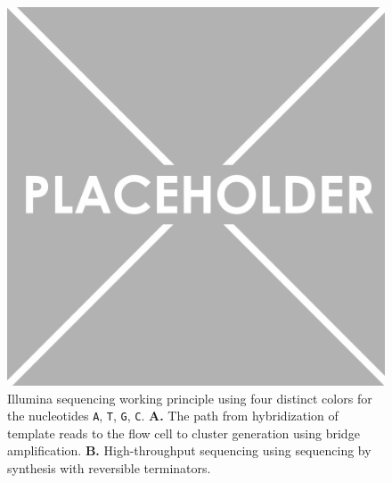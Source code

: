 \documentclass[11pt]{book}
\begin{document}
\begin{figure}[t!]
\centering
\includegraphics[width=\textwidth,trim=0 5cm 0 0,clip]{img/placeholder.png}
\caption[Illumina Sequencing Working Principle]{Illumina sequencing working principle using four distinct colors for the nucleotides \texttt{A}, \texttt{T}, \texttt{G}, \texttt{C}. \textbf{A.} The path from hybridization of template reads to the flow cell to cluster generation using bridge amplification. \textbf{B.} High-throughput sequencing using sequencing by synthesis with reversible terminators.}
\label{fig:illumina-seq}
\end{figure}
\end{document}
